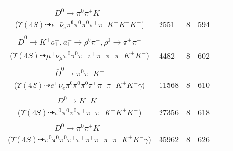 \documentclass[landscape]{article}
\newcounter{rownumbers}
\newcommand\rn{\stepcounter{rownumbers}\arabic{rownumbers}}
\newcommand{\EOLP}{\\ \hline} %
\newcommand{\topoTags}[1]{#1} %
\begin{document}
\begin{longtable}{clcccc}
\rn & \makecell[l]{ $ 
\Upsilon(4S) \rightarrow B^{+} B^{-} ,
B^{+} \rightarrow \rho^{+} \bar{D}^{0} ,
B^{-} \rightarrow e^{-} \bar{\nu}_{e} D^{*0} ,
\rho^{+} \rightarrow \pi^{0} \pi^{+} ,
\bar{D}^{0} \rightarrow K^{+} K^{-} ,
D^{*0} \rightarrow \pi^{0} D^{0} ,
$ \\ $
D^{0} \rightarrow \pi^{0} \pi^{+} K^{-} 
$ \\ ($
\Upsilon(4S) \dashrightarrow e^{-} \bar{\nu}_{e} \pi^{0} \pi^{0} \pi^{0} \pi^{+} \pi^{+} K^{+} K^{-} K^{-} 
$) } & \topoTags{2551 & }8 & 594 \EOLP

\rn & \makecell[l]{ $ 
\Upsilon(4S) \rightarrow B^{+} B^{-} ,
B^{+} \rightarrow \mu^{+} \nu_{\mu} \bar{D}^{*0} ,
B^{-} \rightarrow \rho^{-} D^{0} ,
\bar{D}^{*0} \rightarrow \pi^{0} \bar{D}^{0} ,
\rho^{-} \rightarrow \pi^{0} \pi^{-} ,
D^{0} \rightarrow \pi^{+} K^{-} ,
$ \\ $
\bar{D}^{0} \rightarrow K^{+} a_{1}^{-} ,
a_{1}^{-} \rightarrow \rho^{0} \pi^{-} ,
\rho^{0} \rightarrow \pi^{+} \pi^{-} 
$ \\ ($
\Upsilon(4S) \dashrightarrow \mu^{+} \nu_{\mu} \pi^{0} \pi^{0} \pi^{+} \pi^{+} \pi^{-} \pi^{-} \pi^{-} K^{+} K^{-} 
$) } & \topoTags{4482 & }8 & 602 \EOLP

\rn & \makecell[l]{ $ 
\Upsilon(4S) \rightarrow B^{+} B^{-} ,
B^{+} \rightarrow e^{+} \nu_{e} \bar{D}^{*0} ,
B^{-} \rightarrow \rho^{-} D^{0} ,
\bar{D}^{*0} \rightarrow \bar{D}^{0} \gamma ,
\rho^{-} \rightarrow \pi^{0} \pi^{-} ,
D^{0} \rightarrow \pi^{0} \pi^{+} K^{-} ,
$ \\ $
\bar{D}^{0} \rightarrow \pi^{0} \pi^{-} K^{+} 
$ \\ ($
\Upsilon(4S) \dashrightarrow e^{+} \nu_{e} \pi^{0} \pi^{0} \pi^{0} \pi^{+} \pi^{-} \pi^{-} K^{+} K^{-} \gamma 
$) } & \topoTags{11568 & }8 & 610 \EOLP

\rn & \makecell[l]{ $ 
\Upsilon(4S) \rightarrow B^{+} B^{-} ,
B^{+} \rightarrow \rho^{+} \bar{D}^{0} ,
B^{-} \rightarrow \rho^{-} D^{0} ,
\rho^{+} \rightarrow \pi^{0} \pi^{+} ,
\bar{D}^{0} \rightarrow \pi^{0} \pi^{-} K^{+} ,
\rho^{-} \rightarrow \pi^{0} \pi^{-} ,
$ \\ $
D^{0} \rightarrow K^{+} K^{-} 
$ \\ ($
\Upsilon(4S) \dashrightarrow \pi^{0} \pi^{0} \pi^{0} \pi^{+} \pi^{-} \pi^{-} K^{+} K^{+} K^{-} 
$) } & \topoTags{27356 & }8 & 618 \EOLP

\rn & \makecell[l]{ $ 
\Upsilon(4S) \rightarrow B^{+} B^{-} ,
B^{+} \rightarrow \rho^{+} \bar{D}^{0} ,
B^{-} \rightarrow \pi^{0} \pi^{+} \pi^{-} \pi^{-} D^{*0} ,
\rho^{+} \rightarrow \pi^{0} \pi^{+} ,
\bar{D}^{0} \rightarrow \pi^{-} K^{+} ,
D^{*0} \rightarrow D^{0} \gamma ,
$ \\ $
D^{0} \rightarrow \pi^{0} \pi^{+} K^{-} 
$ \\ ($
\Upsilon(4S) \dashrightarrow \pi^{0} \pi^{0} \pi^{0} \pi^{+} \pi^{+} \pi^{+} \pi^{-} \pi^{-} \pi^{-} K^{+} K^{-} \gamma 
$) } & \topoTags{35962 & }8 & 626 \EOLP


\end{longtable}
\end{document}
